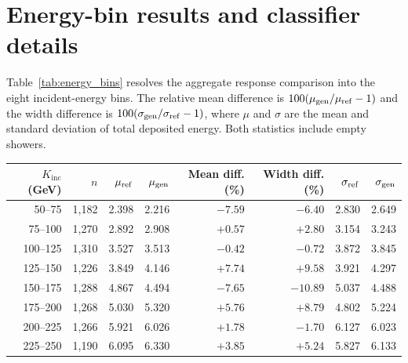 \documentclass[10pt]{article}
\newcommand{\Kinc}{K_{\mathrm{inc}}}
\begin{document}
\section{Energy-bin results and classifier details}
\label{app:additional}

Table~\ref{tab:energy_bins} resolves the aggregate response comparison into the eight incident-energy bins. The relative mean difference is $100(\mu_{\rm gen}/\mu_{\rm ref}-1)$ and the width difference is $100(\sigma_{\rm gen}/\sigma_{\rm ref}-1)$, where $\mu$ and $\sigma$ are the mean and standard deviation of total deposited energy. Both statistics include empty showers.

\begin{center}
\begin{minipage}{\linewidth}
\centering
{}
\label{tab:energy_bins}
\small
\begin{tabular}{@{}rrrrrrrr@{}}
\toprule
$\Kinc$ (GeV) & $n$ & $\mu_{\rm ref}$ & $\mu_{\rm gen}$ & Mean diff. (\%) & Width diff. (\%) & $\sigma_{\rm ref}$ & $\sigma_{\rm gen}$ \\
\midrule
50--75 & 1,182 & 2.398 & 2.216 & $-7.59$ & $-6.40$ & 2.830 & 2.649 \\
75--100 & 1,270 & 2.892 & 2.908 & $+0.57$ & $+2.80$ & 3.154 & 3.243 \\
100--125 & 1,310 & 3.527 & 3.513 & $-0.42$ & $-0.72$ & 3.872 & 3.845 \\
125--150 & 1,226 & 3.849 & 4.146 & $+7.74$ & $+9.58$ & 3.921 & 4.297 \\
150--175 & 1,288 & 4.867 & 4.494 & $-7.65$ & $-10.89$ & 5.037 & 4.488 \\
175--200 & 1,268 & 5.030 & 5.320 & $+5.76$ & $+8.79$ & 4.802 & 5.224 \\
200--225 & 1,266 & 5.921 & 6.026 & $+1.78$ & $-1.70$ & 6.127 & 6.023 \\
225--250 & 1,190 & 6.095 & 6.330 & $+3.85$ & $+5.24$ & 5.827 & 6.133 \\
\bottomrule
\end{tabular}
\end{minipage}
\end{center}
\end{document}
